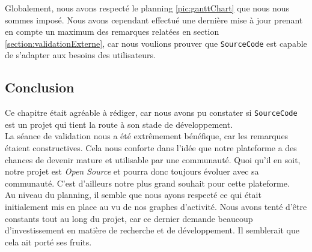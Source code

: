 Globalement, nous avons respecté le planning \ref{pic:ganttChart} que nous nous sommes imposé. Nous avons cependant effectué une dernière mise à jour prenant en compte un maximum des remarques relatées en section \ref{section:validationExterne}, car nous voulions prouver que \texttt{SourceCode} est capable de s'adapter aux besoins des utilisateurs.

\subsection{Conclusion}

Ce chapitre était agréable à rédiger, car nous avons pu constater si \texttt{SourceCode} est un projet qui tient la route à son stade de développement.\\

La séance de validation nous a été extrêmement bénéfique, car les remarques étaient constructives. Cela nous conforte dans l'idée que notre plateforme a des chances de devenir mature et utilisable par une communauté. Quoi qu'il en soit, notre projet est \textit{Open Source} et pourra donc toujours évoluer avec sa communauté. C'est d'ailleurs notre plus grand souhait pour cette plateforme.\\

Au niveau du planning, il semble que nous ayons respecté ce qui était initialement mis en place au vu de nos graphes d'activité. Nous avons tenté d'être constants tout au long du projet, car ce dernier demande beaucoup d'investissement en matière de recherche et de développement. Il semblerait que cela ait porté ses fruits.